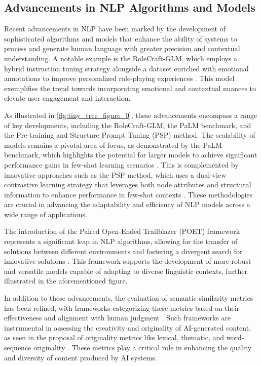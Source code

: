 \subsection{Advancements in NLP Algorithms and Models} \label{subsec:Advancements in NLP Algorithms and Models}

Recent advancements in NLP have been marked by the development of sophisticated algorithms and models that enhance the ability of systems to process and generate human language with greater precision and contextual understanding. A notable example is the RoleCraft-GLM, which employs a hybrid instruction tuning strategy alongside a dataset enriched with emotional annotations to improve personalized role-playing experiences \cite{tao2024rolecraftglmadvancingpersonalizedroleplaying}. This model exemplifies the trend towards incorporating emotional and contextual nuances to elevate user engagement and interaction.

As illustrated in \autoref{fig:tiny_tree_figure_0}, these advancements encompass a range of key developments, including the RoleCraft-GLM, the PaLM benchmark, and the Pre-training and Structure Prompt Tuning (PSP) method. The scalability of models remains a pivotal area of focus, as demonstrated by the PaLM benchmark, which highlights the potential for larger models to achieve significant performance gains in few-shot learning scenarios \cite{chowdhery2023palm}. This is complemented by innovative approaches such as the PSP method, which uses a dual-view contrastive learning strategy that leverages both node attributes and structural information to enhance performance in few-shot contexts \cite{ge2024psppretrainingstructureprompt}. These methodologies are crucial in advancing the adaptability and efficiency of NLP models across a wide range of applications.

The introduction of the Paired Open-Ended Trailblazer (POET) framework represents a significant leap in NLP algorithms, allowing for the transfer of solutions between different environments and fostering a divergent search for innovative solutions \cite{wang2019pairedopenendedtrailblazerpoet}. This framework supports the development of more robust and versatile models capable of adapting to diverse linguistic contexts, further illustrated in the aforementioned figure.

In addition to these advancements, the evaluation of semantic similarity metrics has been refined, with frameworks categorizing these metrics based on their effectiveness and alignment with human judgment \cite{yamshchikov2020styletransferparaphraselookingsensible}. Such frameworks are instrumental in assessing the creativity and originality of AI-generated content, as seen in the proposal of originality metrics like lexical, thematic, and word-sequence originality \cite{palmini2024patternscreativityuserinput}. These metrics play a critical role in enhancing the quality and diversity of content produced by AI systems.

